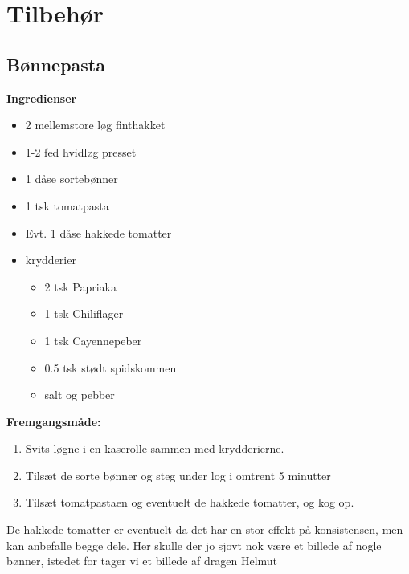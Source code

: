 \documentclass{book}
\begin{document}
\chapter{Tilbehør}
\minitoc
\newpage \section{Bønnepasta}
\begin{minipage}[t]{0.5\textwidth}
\textbf{Ingredienser}
\begin{itemize}
    \item 2 mellemstore løg finthakket
    \item 1-2 fed hvidløg presset
    \item 1 dåse sortebønner
    \item 1 tsk tomatpasta
    \item Evt. 1 dåse hakkede tomatter
    \item krydderier
    \begin{itemize}
        \item 2 tsk Papriaka
        \item 1 tsk Chiliflager
        \item 1 tsk Cayennepeber
        \item 0.5 tsk stødt spidskommen
        \item salt og pebber
    \end{itemize}
\end{itemize}
\end{minipage}
\begin{minipage}[t]{0.5\textwidth}
\textbf{Fremgangsmåde:}
\begin{enumerate}
    \item Svits løgne i en kaserolle sammen med krydderierne.
    \item Tilsæt de sorte bønner og steg under log i omtrent 5 minutter
    \item Tilsæt tomatpastaen og eventuelt de hakkede tomatter, og kog op.
\end{enumerate}
\end{minipage}
De hakkede tomatter er eventuelt da det har en stor effekt på konsistensen, men kan anbefalle begge dele.
\newpage 
Her skulle der jo sjovt nok være et billede af nogle bønner, istedet for tager vi et billede af dragen Helmut 
\end{document}
